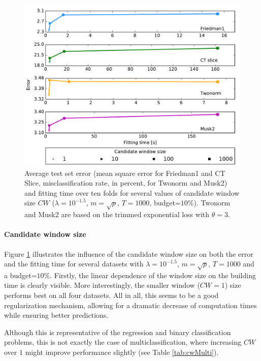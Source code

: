 \documentclass{article}
\begin{document}
\begin{figure}[ht]
\begin{center}
\centerline{\includegraphics[width=\columnwidth]{cw_4}}
\caption{Average test set error (mean square error for Friedman1 and CT Slice, 
misclassification rate, in percent, for Twonorm and Musk2) and fitting time 
over ten folds for several values of candidate window size $CW$
($\lambda=10^{-1.5}$, $m=\sqrt{p}$, $T=1000$, budget=$10\%$). Twonorm and Musk2 
are based on the trimmed exponential loss with $\theta=3$. }
\label{fig:cw4}
\end{center}
\vskip -0.2in
\end{figure} 

\paragraph{Candidate window size}
Figure \ref{fig:cw4} illustrates the influence of the candidate window size on 
both the error and the fitting time for several datasets with 
$\lambda=10^{-1.5}$, $m=\sqrt{p}$, $T=1000$ and a budget=$10\%$. 
Firstly, the linear dependence of the window size on the building time is 
clearly visible. More interestingly, the smaller window ($CW=1$) size performs 
best on all four datasets. All in all, this seems to be a good regularization 
mechanism, allowing for a dramatic decrease of computation times while ensuring 
better predictions.

Although this is representative of the regression and binary classification 
problems, this is not exactly the case of multiclassification, where increasing 
$CW$ over $1$ might improve performance slightly (see Table \ref{tab:cwMulti}).
\end{document}

